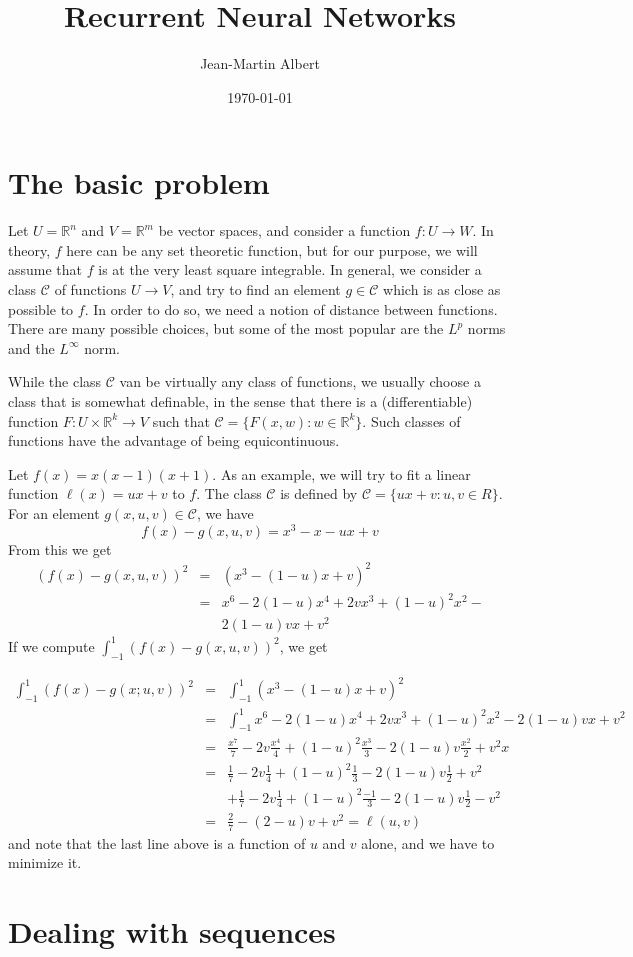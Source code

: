 \documentclass[10pt]{amsart}
\newcommand{\R}{\mathbb{R}}
\newcommand{\C}{\mathcal{C}}
\begin{document}
\title{Recurrent Neural Networks}
\author{Jean-Martin Albert}
\date{\today}
\maketitle

\section{The basic problem}

Let $U=\R^n$ and $V=\R^m$ be vector spaces, and consider a function $f:U\to W$.
In theory, $f$ here can be any set theoretic function, but for our purpose, we
will assume that $f$ is at the very least square integrable. In general, we
consider a class $\C$ of functions $U\to V$, and try to find an element $g\in\C$
which is as close as possible to $f$.  In order to do so, we need a notion of distance
between functions.  There are many possible choices, but some of the most popular are
the $L^p$ norms and the $L^\infty$ norm.

While the class $\C$ van be virtually any class of functions, we usually choose a class
that is somewhat definable, in the sense that there is a (differentiable) function $F:U\times\R^k\to V$
such that $\C=\{F(x, w): w\in \R^k\}$.  Such classes of functions have the advantage of
being equicontinuous.


Let $f(x)=x(x-1)(x+1)$.  As an example, we will try to fit a linear function
$\ell(x)=ux+v$ to $f$.  The class $\C$ is defined by $\C=\{ux+v:u,v\in R\}$.
For an element $g(x, u, v)\in\C$, we have $$f(x)-g(x,u,v) = x^3-x - ux+v$$
From this we get
\begin{eqnarray*}
  (f(x)-g(x,u,v))^2 &=& (x^3 - (1-u)x + v)^2 \\
  {} &=& x^6 - 2(1-u)x^4 + 2vx^3 + (1-u)^2x^2 - \\
  {} & & 2(1-u)vx + v^2
\end{eqnarray*}
If we compute $\int_{-1}^1 (f(x)-g(x,u,v))^2$, we get

\begin{eqnarray*}
  \int_{-1}^1(f(x)-g(x; u,v))^2 &=& \int_{-1}^1(x^3 - (1-u)x + v)^2 \\
  {} &=& \int_{-1}^1x^6 - 2(1-u)x^4 + 2vx^3 + (1-u)^2x^2 - 2(1-u)vx + v^2\\
  {} &=& \frac{x^7}{7}-2v\frac{x^4}{4} + (1-u)^2\frac{x^3}{3} - 2(1-u)v\frac{x^2}{2}+v^2x\\
  {} &=& \frac{1}{7}-2v\frac{1}{4} + (1-u)^2\frac{1}{3} - 2(1-u)v\frac{1}{2}+v^2\\
  {} & & +\frac{1}{7}-2v\frac{1}{4} + (1-u)^2\frac{-1}{3} - 2(1-u)v\frac{1}{2}-v^2\\
  {} &=& \frac{2}{7} - (2-u)v+v^2 = \ell(u,v)
\end{eqnarray*}
and note that the last line above is a function of $u$ and $v$ alone, and we have to minimize it.


\section{Dealing with sequences}
\end{document}
